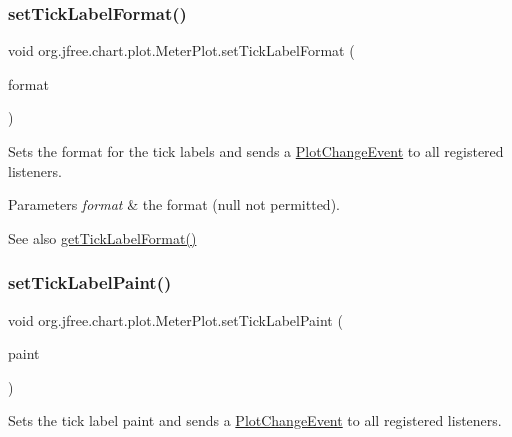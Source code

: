\subsubsection{\texorpdfstring{set\+Tick\+Label\+Format()}{setTickLabelFormat()}}
{\footnotesize\ttfamily void org.\+jfree.\+chart.\+plot.\+Meter\+Plot.\+set\+Tick\+Label\+Format (\begin{DoxyParamCaption}\item[{Number\+Format}]{format }\end{DoxyParamCaption})}

Sets the format for the tick labels and sends a \mbox{\hyperlink{}{Plot\+Change\+Event}} to all registered listeners.


\begin{DoxyParams}{Parameters}
{\em format} & the format ({\ttfamily null} not permitted).\\
\hline
\end{DoxyParams}
\begin{DoxySeeAlso}{See also}
\mbox{\hyperlink{classorg_1_1jfree_1_1chart_1_1plot_1_1_meter_plot_af7eb3b4f3cb33da29b6d951761e83eb1}{get\+Tick\+Label\+Format()}} 
\end{DoxySeeAlso}
\mbox{\label{classorg_1_1jfree_1_1chart_1_1plot_1_1_meter_plot_af626b2132fcbeed2c4c900da682deb74}} 
\subsubsection{\texorpdfstring{set\+Tick\+Label\+Paint()}{setTickLabelPaint()}}
{\footnotesize\ttfamily void org.\+jfree.\+chart.\+plot.\+Meter\+Plot.\+set\+Tick\+Label\+Paint (\begin{DoxyParamCaption}\item[{Paint}]{paint }\end{DoxyParamCaption})}

Sets the tick label paint and sends a \mbox{\hyperlink{}{Plot\+Change\+Event}} to all registered listeners.



